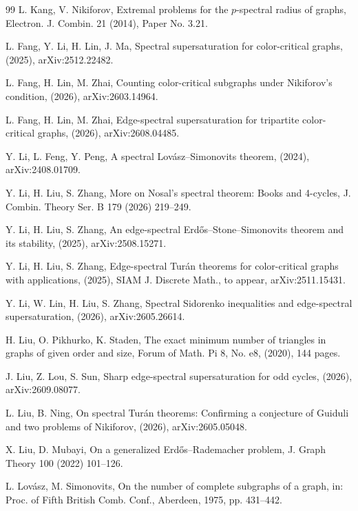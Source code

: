 \documentclass[11pt,a4paper]{article}
\theoremstyle{definition}
\theoremstyle{plain}
\begin{document}
\begin{thebibliography}{99}
L. Kang, V. Nikiforov, 
Extremal problems for the $p$-spectral radius of graphs, Electron. J. Combin. 21 (2014), Paper No. 3.21. 


L. Fang, Y. Li, H. Lin, J. Ma, 
Spectral supersaturation for color-critical graphs, (2025), arXiv:2512.22482. 

L. Fang, H. Lin, M. Zhai, 
Counting color-critical subgraphs 
under Nikiforov's condition, 
(2026), arXiv:2603.14964. 

L. Fang, H. Lin, M. Zhai, 
Edge-spectral supersaturation for 
tripartite color-critical graphs, 
(2026), arXiv:2608.04485. 


Y. Li, L. Feng, Y. Peng,
{A spectral Lov\'{a}sz--Simonovits theorem}, 
(2024), arXiv:2408.01709.

Y. Li, H. Liu, S. Zhang, 
More on Nosal's spectral theorem: Books and 4-cycles, 
J. Combin. Theory Ser. B 179 (2026) 219--249. 


Y. Li, H. Liu, S. Zhang, 
An edge-spectral Erd\H{o}s--Stone--Simonovits theorem and its stability, 
 (2025), arXiv:2508.15271.  

Y. Li, H. Liu, S. Zhang, 
 Edge-spectral Tur\'{a}n theorems for color-critical graphs with applications, 
 (2025), {SIAM J. Discrete Math.}, to appear, arXiv:2511.15431.

Y. Li, W. Lin,  H. Liu, S. Zhang, 
Spectral Sidorenko inequalities and edge-spectral supersaturation, (2026), arXiv:2605.26614.  

H. Liu, O. Pikhurko, K. Staden, 
The exact minimum number of triangles in graphs of given order and size, 
Forum of Math. Pi 8, No. e8, (2020), 144 pages. 


J. Liu, Z. Lou, S. Sun, 
Sharp edge-spectral supersaturation for odd cycles, 
(2026), arXiv:2609.08077. 


L. Liu, B. Ning, On spectral Tur\'{a}n theorems: 
Confirming a conjecture of Guiduli and two problems of Nikiforov, 
(2026), arXiv:2605.05048. 

X. Liu, D. Mubayi, 
On a generalized Erd\H{o}s--Rademacher problem, 
J. Graph Theory 100 (2022) 101--126. 

L. Lov\'{a}sz, M. Simonovits,
On the number of complete subgraphs of a graph,
in: Proc. of Fifth British Comb. Conf., Aberdeen, 1975,
pp. 431--442.



\end{thebibliography}
\end{document}
